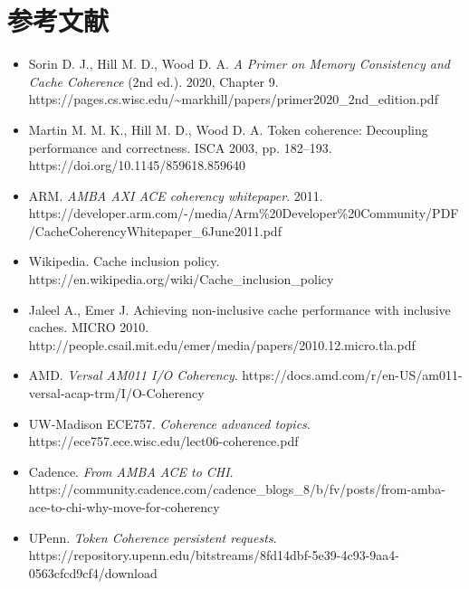 \section*{参考文献}
\begin{itemize}
\item Sorin D. J., Hill M. D., Wood D. A. \emph{A Primer on Memory Consistency and Cache Coherence} (2nd ed.). 2020, Chapter 9. https://pages.cs.wisc.edu/\textasciitilde{}markhill/papers/primer2020\_2nd\_edition.pdf
\item Martin M. M. K., Hill M. D., Wood D. A. Token coherence: Decoupling performance and correctness. ISCA 2003, pp. 182–193. https://doi.org/10.1145/859618.859640
\item ARM. \emph{AMBA AXI ACE coherency whitepaper}. 2011. https://developer.arm.com/-/media/Arm\%20Developer\%20Community/PDF/CacheCoherencyWhitepaper\_6June2011.pdf
\item Wikipedia. Cache inclusion policy. https://en.wikipedia.org/wiki/Cache\_inclusion\_policy
\item Jaleel A., Emer J. Achieving non-inclusive cache performance with inclusive caches. MICRO 2010. http://people.csail.mit.edu/emer/media/papers/2010.12.micro.tla.pdf
\item AMD. \emph{Versal AM011 I/O Coherency}. https://docs.amd.com/r/en-US/am011-versal-acap-trm/I/O-Coherency
\item UW-Madison ECE757. \emph{Coherence advanced topics}. https://ece757.ece.wisc.edu/lect06-coherence.pdf
\item Cadence. \emph{From AMBA ACE to CHI}. https://community.cadence.com/cadence\_blogs\_8/b/fv/posts/from-amba-ace-to-chi-why-move-for-coherency
\item UPenn. \emph{Token Coherence persistent requests}. https://repository.upenn.edu/bitstreams/8fd14dbf-5e39-4c93-9aa4-0563cfcd9cf4/download
\end{itemize}
